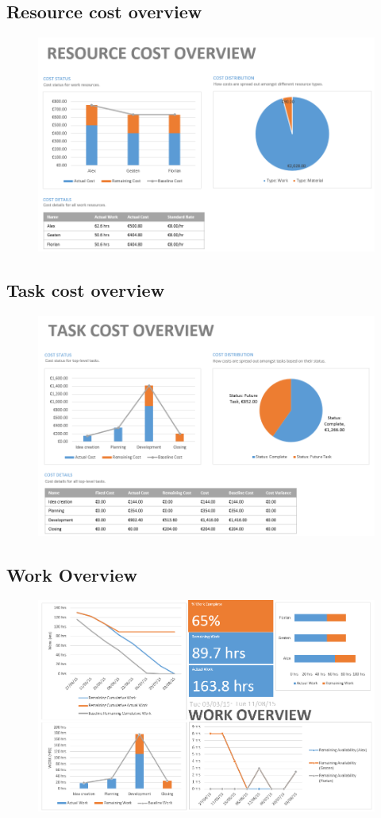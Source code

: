 \documentclass[english]{article}
\begin{document}
\subsection{Resource cost overview}
\begin{figure}[H]
\centerline{\includegraphics[scale=1]{FR/rco}}
\end{figure}
\subsection{Task cost overview}
\begin{figure}[H]
\centerline{\includegraphics[scale=1]{FR/tco}}
\end{figure}
\subsection{Work Overview}
\begin{figure}[H]
\centerline{\includegraphics[scale=0.8]{FR/wo}}
\end{figure}
\end{document}
